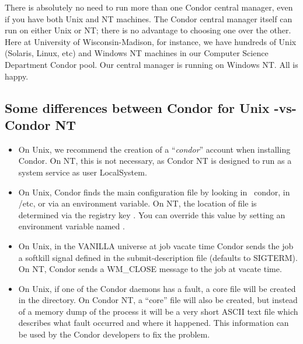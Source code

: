 There is absolutely no need to run more than one Condor central manager,
even if you have both Unix and NT machines.  The Condor central manager
itself can run on either Unix or NT; there is no advantage to choosing
one over the other.  Here at University of Wisconsin-Madison, for
instance, we have hundreds of Unix (Solaris, Linux, etc) and
Windows NT machines in our Computer Science Department Condor pool.
Our central manager is running on Windows NT.  All is happy.

\subsection{Some differences between Condor for Unix -vs- Condor NT}

\begin{itemize}

\item On Unix, we recommend the creation of a ``\textit{condor}'' account
when installing Condor.  On NT, this is not necessary, as Condor NT is
designed to run as a system service as user LocalSystem.

\item On Unix, Condor finds the  main configuration
file by looking in ~condor, in /etc, or via an environment variable.
On NT, the location of  file is determined
via the registry key .
You can override this value by setting an environment variable named
.

\item On Unix, in the VANILLA universe at job vacate time Condor sends the
job a softkill signal defined in the submit-description file (defaults to
SIGTERM).  On NT, Condor sends a WM\_CLOSE message to the job at vacate
time.

\item On Unix, if one of the Condor daemons has a fault, a core file
will be created in the  directory.  On Condor NT, a
``core'' file will also be created, but instead of a memory dump of the
process it will be a very short ASCII text file which describes what
fault occurred and where it happened.  This information can be used by
the Condor developers to fix the problem.

\end{itemize}
